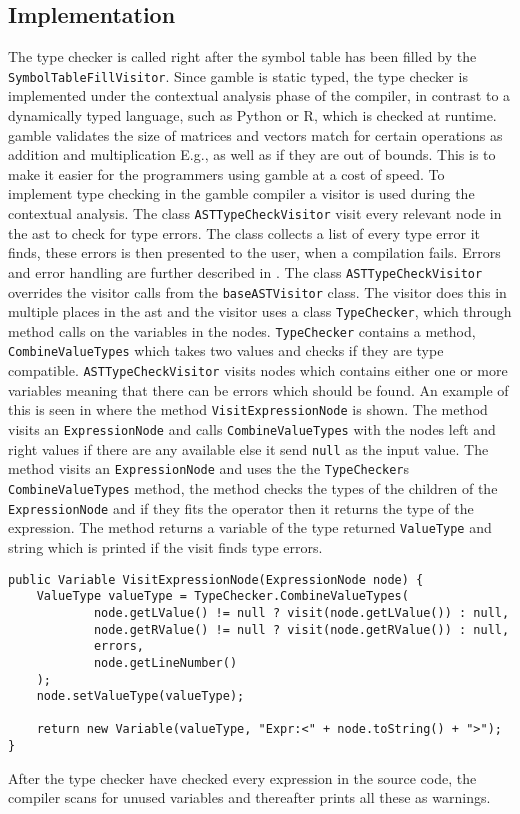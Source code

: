 \subsection*{Implementation}
The type checker is called right after the symbol table has been filled by the \texttt{SymbolTableFillVisitor}.
Since \gls{gamble} is static typed, the type checker is implemented under the contextual analysis phase of the compiler, in contrast to a dynamically typed language, such as Python or R, which is checked at runtime. 
\gls{gamble} validates the size of matrices and vectors match for certain operations as addition and multiplication E.g., as well as if they are out of bounds. 
This is to make it easier for the programmers using \gls{gamble} at a cost of speed. 
To implement type checking in the \gls{gamble} compiler a visitor is used during the contextual analysis.
The class \texttt{ASTTypeCheckVisitor} visit every relevant node in the \acrshort{ast} to check for type errors.
The class collects a list of every type error it finds, these errors is then presented to the user, when a compilation fails.
Errors and error handling are further described in .
The class \texttt{ASTTypeCheckVisitor} overrides the visitor calls from the \texttt{baseASTVisitor} class.
The visitor does this in multiple places in the \acrshort{ast} and the visitor uses a class \texttt{TypeChecker}, which through method calls on the variables in the nodes.
\texttt{TypeChecker} contains a method, \texttt{CombineValueTypes} which takes two values and checks if they are type compatible.
\texttt{ASTTypeCheckVisitor} visits nodes which contains either one or more variables meaning that there can be errors which should be found. 
An example of this is seen in  where the method \texttt{VisitExpressionNode}
 is shown.
The method visits an \texttt{ExpressionNode} and calls \texttt{CombineValueTypes} with the nodes left and right values if there are any available else it send \texttt{null} as the input value.
The method visits an \texttt{ExpressionNode} and uses the the \texttt{TypeChecker}s \texttt{CombineValueTypes} method, the method checks the types of the children of the \texttt{ExpressionNode} and if they fits the operator then it returns the type of the expression. 
The method returns a variable of the type returned \texttt{ValueType} and string which is printed if the visit finds type errors.

\begin{lstlisting}[caption=The VisitExprressionNode method in the ASTTypeChecker class,numbers=none,frame=tlrb,label={lst:typecheck1}]
public Variable VisitExpressionNode(ExpressionNode node) {
    ValueType valueType = TypeChecker.CombineValueTypes(
            node.getLValue() != null ? visit(node.getLValue()) : null,
            node.getRValue() != null ? visit(node.getRValue()) : null,
            errors,
            node.getLineNumber()
    );
    node.setValueType(valueType);

    return new Variable(valueType, "Expr:<" + node.toString() + ">");
}
\end{lstlisting}

After the type checker have checked every expression in the source code, the compiler scans for unused variables and thereafter prints all these as warnings. 